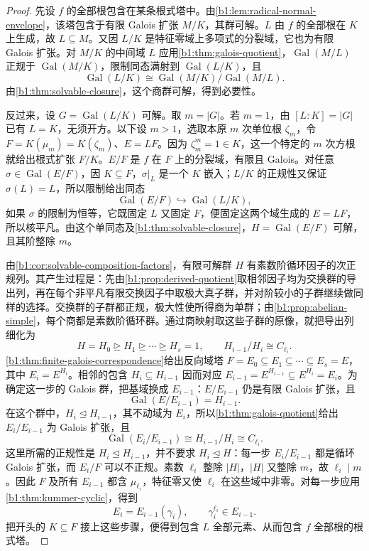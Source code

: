 \begin{proof}
	先设 \(f\) 的全部根包含在某条根式塔中。由\cref{b1:lem:radical-normal-envelope}，该塔包含于有限 Galois 扩张 \(M/K\)，其群可解。\(L\) 由 \(f\) 的全部根在 \(K\) 上生成，故 \(L\subseteq M\)。又因 \(L/K\) 是特征零域上多项式的分裂域，它也为有限 Galois 扩张。对 \(M/K\) 的中间域 \(L\) 应用\cref{b1:thm:galois-quotient}，\(\operatorname{Gal}(M/L)\) 正规于 \(\operatorname{Gal}(M/K)\)，限制同态满射到 \(\operatorname{Gal}(L/K)\)，且
	\[
		\operatorname{Gal}(L/K)\cong \operatorname{Gal}(M/K)/\operatorname{Gal}(M/L).
	\]
	由\cref{b1:thm:solvable-closure}，这个商群可解，得到必要性。

	反过来，设 \(G=\operatorname{Gal}(L/K)\) 可解。取 \(m=|G|\)。若 \(m=1\)，由 \([L:K]=|G|\) 已有 \(L=K\)，无须开方。以下设 \(m>1\)，选取本原 \(m\) 次单位根 \(\zeta_m\)，令 \(F=K(\mu_m)=K(\zeta_m)\)、\(E=LF\)。因为 \(\zeta_m^m=1\in K\)，这一个特定的 \(m\) 次方根就给出根式扩张 \(F/K\)。\(E/F\) 是 \(f\) 在 \(F\) 上的分裂域，有限且 Galois。对任意 \(\sigma\in\operatorname{Gal}(E/F)\)，因 \(K\subseteq F\)，\(\sigma|_L\) 是一个 \(K\) 嵌入；\(L/K\) 的正规性又保证 \(\sigma(L)=L\)，所以限制给出同态
	\[
		\operatorname{Gal}(E/F)\hookrightarrow\operatorname{Gal}(L/K),
	\]
	如果 \(\sigma\) 的限制为恒等，它既固定 \(L\) 又固定 \(F\)，便固定这两个域生成的 \(E=LF\)，所以核平凡。由这个单同态及\cref{b1:thm:solvable-closure}，\(H=\operatorname{Gal}(E/F)\) 可解，且其阶整除 \(m\)。

	由\cref{b1:cor:solvable-composition-factors}，有限可解群 \(H\) 有素数阶循环因子的次正规列。其产生过程是：先由\cref{b1:prop:derived-quotient}取相邻因子均为交换群的导出列，再在每个非平凡有限交换因子中取极大真子群，并对阶较小的子群继续做同样的选择。交换群的子群都正规，极大性使所得商为单群；由\cref{b1:prop:abelian-simple}，每个商都是素数阶循环群。通过商映射取这些子群的原像，就把导出列细化为
	\[
		H=H_0\trianglerighteq H_1\trianglerighteq\cdots\trianglerighteq H_s=1, \qquad H_{i-1}/H_i\cong C_{\ell_i}.
	\]
	\cref{b1:thm:finite-galois-correspondence}给出反向域塔 \(F=E_0\subseteq E_1\subseteq\cdots\subseteq E_s=E\)，其中 \(E_i=E^{H_i}\)。相邻的包含 \(H_i\subseteq H_{i-1}\) 因而对应 \(E_{i-1}=E^{H_{i-1}}\subseteq E^{H_i}=E_i\)。为确定这一步的 Galois 群，把基域换成 \(E_{i-1}\)：\(E/E_{i-1}\) 仍是有限 Galois 扩张，且
	\[
		\operatorname{Gal}(E/E_{i-1})=H_{i-1}.
	\]
	在这个群中，\(H_i\trianglelefteq H_{i-1}\)，其不动域为 \(E_i\)，所以\cref{b1:thm:galois-quotient}给出 \(E_i/E_{i-1}\) 为 Galois 扩张，且
	\[
		\operatorname{Gal}(E_i/E_{i-1})\cong H_{i-1}/H_i\cong C_{\ell_i}.
	\]
	这里所需的正规性是 \(H_i\trianglelefteq H_{i-1}\)，并不要求 \(H_i\trianglelefteq H\)：每一步 \(E_i/E_{i-1}\) 都是循环 Galois 扩张，而 \(E_i/F\) 可以不正规。素数 \(\ell_i\) 整除 \(|H|\)，\(|H|\) 又整除 \(m\)，故 \(\ell_i\mid m\)。因此 \(F\) 及所有 \(E_{i-1}\) 都含 \(\mu_{\ell_i}\)，特征零又使 \(\ell_i\) 在这些域中非零。对每一步应用\cref{b1:thm:kummer-cyclic}，得到
	\[
		E_i=E_{i-1}(\gamma_i),\qquad \gamma_i^{\ell_i}\in E_{i-1}.
	\]
	把开头的 \(K\subseteq F\) 接上这些步骤，便得到包含 \(L\) 全部元素、从而包含 \(f\) 全部根的根式塔。
\end{proof}


